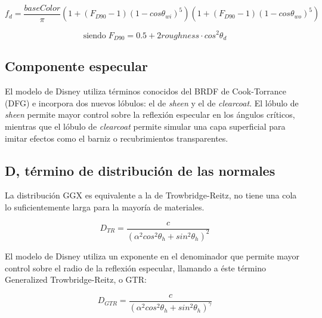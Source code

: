     
        $$
        f_d = \frac{baseColor}{\pi}
        \left(  1 + (F_{D90} - 1)(1 - cos\theta_{wi})^5  \right)
        \left(  1 + (F_{D90} - 1)(1 - cos\theta_{wo})^5  \right)
        $$
    
        \begin{equation}
        \textrm{siendo} \; F_{D90} = 0.5 + 2roughness\cdot{cos^2\theta_d}
        \end{equation}
    
        \singlespacing
        \subsection{Componente especular}
        El modelo de Disney \autocite{disney12} utiliza t\'erminos conocidos del BRDF de Cook-Torrance \autocite{cooktorrance}
        (DFG) e incorpora dos nuevos l\'obulos: el de \textit{sheen} y el de \textit{clearcoat}. El l\'obulo de \textit{sheen}
        permite mayor control sobre la reflexi\'on especular en los \'angulos cr\'iticos, mientras que el l\'obulo de
        \textit{clearcoat} permite simular una capa superficial para imitar efectos como el barniz o recubrimientos
        transparentes.

            \subsection*{D, t\'ermino de distribuci\'on de las normales}
                La distribuci\'on GGX es equivalente a la de Trowbridge-Reitz, no tiene una cola lo suficientemente larga para la
                mayor\'ia de materiales.

                \begin{equation}
                    D_{TR} = \frac
                    {c}
                    {(\alpha^2 cos^2 \theta_h + sin^2 \theta_h)^2}
                \end{equation}
                \singlespacing

                El modelo de Disney utiliza un exponente en el denominador que permite mayor control sobre el radio de la reflexi\'on
                especular, llamando a \'este t\'ermino Generalized Trowbridge-Reitz, o GTR:

                \begin{equation}
                    D_{GTR} = \frac
                    {c}
                    {(\alpha^2 cos^2 \theta_h + sin^2 \theta_h)^\gamma}
                \end{equation}
                \singlespacing

